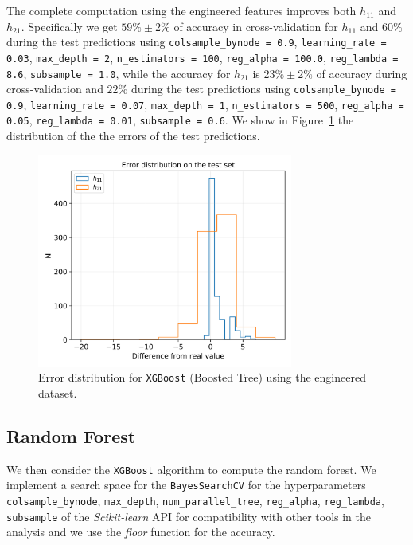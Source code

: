     The complete computation using the engineered features improves both $h_{11}$ and $h_{21}$. Specifically we get $59\% \pm 2\%$ of accuracy in cross-validation for $h_{11}$ and $60\%$ during the test predictions using \texttt{colsample\_bynode = 0.9}, \texttt{learning\_rate = 0.03}, \texttt{max\_depth = 2}, \texttt{n\_estimators = 100}, \texttt{reg\_alpha = 100.0}, \texttt{reg\_lambda = 8.6}, \texttt{subsample = 1.0}, while the accuracy for $h_{21}$ is $23\% \pm 2\%$ of accuracy during cross-validation and $22\%$ during the test predictions using \texttt{colsample\_bynode = 0.9}, \texttt{learning\_rate = 0.07}, \texttt{max\_depth = 1}, \texttt{n\_estimators = 500}, \texttt{reg\_alpha = 0.05}, \texttt{reg\_lambda = 0.01}, \texttt{subsample = 0.6}. We show in Figure~\ref{fig:xgb_err} the distribution of the the errors of the test predictions.
    
    \begin{figure}[t]
        \centering
        \includegraphics[width=0.75\textwidth]{tex/img/xgb_error_eng.png}
        \caption{Error distribution for \texttt{XGBoost} (Boosted Tree) using the engineered dataset.}
        \label{fig:xgb_err}
    \end{figure}
    
\subsection{Random Forest}
    We then consider the \texttt{XGBoost} algorithm to compute the random forest. We implement a search space for the \texttt{BayesSearchCV} for the hyperparameters \texttt{colsample\_bynode}, \texttt{max\_depth}, \texttt{num\_parallel\_tree}, \texttt{reg\_alpha}, \texttt{reg\_lambda}, \texttt{subsample} of the \textit{Scikit-learn} API for compatibility with other tools in the analysis and we use the \textit{floor} function for the accuracy.
    
